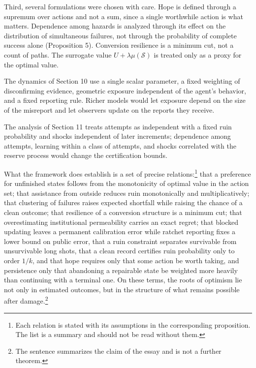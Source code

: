 \documentclass[11pt]{article}
\theoremstyle{remark}
\begin{document}
Third, several formulations were chosen with care. Hope is defined through a supremum over actions and not a sum, since a single worthwhile action is what matters. Dependence among hazards is analyzed through its effect on the distribution of simultaneous failures, not through the probability of complete success alone (Proposition 5). Conversion resilience is a minimum cut, not a count of paths. The surrogate value $U+\lambda\mu(\mathcal S)$ is treated only as a proxy for the optimal value.

The dynamics of Section 10 use a single scalar parameter, a fixed weighting of disconfirming evidence, geometric exposure independent of the agent's behavior, and a fixed reporting rule. Richer models would let exposure depend on the size of the misreport and let observers update on the reports they receive.

The analysis of Section 11 treats attempts as independent with a fixed ruin probability and shocks independent of later increments; dependence among attempts, learning within a class of attempts, and shocks correlated with the reserve process would change the certification bounds.

What the framework does establish is a set of precise relations:\footnote{Each relation is stated with its assumptions in the corresponding proposition. The list is a summary and should not be read without them.} that a preference for unfinished states follows from the monotonicity of optimal value in the action set; that assistance from outside reduces ruin monotonically and multiplicatively; that clustering of failures raises expected shortfall while raising the chance of a clean outcome; that resilience of a conversion structure is a minimum cut; that overestimating institutional permeability carries an exact regret; that blocked updating leaves a permanent calibration error while ratchet reporting fixes a lower bound on public error, that a ruin constraint separates survivable from unsurvivable long shots, that a clean record certifies ruin probability only to order $1/k$, and that hope requires only that some action be worth taking, and persistence only that abandoning a repairable state be weighted more heavily than continuing with a terminal one. On these terms, the roots of optimism lie not only in estimated outcomes, but in the structure of what remains possible after damage.\footnote{The sentence summarizes the claim of the essay and is not a further theorem.}
\end{document}
